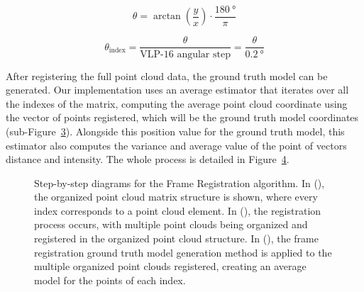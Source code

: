 \begin{equation}
\label{eq:azimuthal-angle}
\theta = \arctan\left(\frac{y}{x}\right) \cdot \frac{\SI{180}{\degree}}{\pi}
\end{equation}

\begin{equation}
\label{eq:azimuthal-angle-index}
\theta_{\text{index}} = \frac{\theta}{\text{VLP-16 angular step}} = \frac{\theta}{\SI{0.2}{\degree}} 
\end{equation}


After registering the full point cloud data, the ground truth model can be generated. Our implementation uses an average estimator that iterates over all the indexes of the matrix, computing the average point cloud coordinate using the vector of points registered, which will be the ground truth model coordinates (sub-Figure~\ref{fig:organized-point-cloud-3}). Alongside this position value for the ground truth model, this estimator also computes the variance and average value of the point of vectors distance and intensity. The whole process is detailed in Figure~\ref{fig:organized-point-cloud}.


\begin{figure}[!ht]
\centering
\begin{subfigure}[c]{0.30\textwidth}
	\def\svgwidth{\columnwidth}
	\graphicspath{{img/lidar-interference/organized-point-cloud/}}
	
	\caption{}
	\label{fig:organized-point-cloud-1}
\end{subfigure}
\quad
\begin{subfigure}[c]{0.30\textwidth}
	\def\svgwidth{\columnwidth}
	\graphicspath{{img/lidar-interference/organized-point-cloud/}}
	
	\caption{}
	\label{fig:organized-point-cloud-2}
\end{subfigure}
\quad
\begin{subfigure}[c]{0.30\textwidth}
	\def\svgwidth{\columnwidth}
	\graphicspath{{img/lidar-interference/organized-point-cloud/}}
	
	\caption{}
	\label{fig:organized-point-cloud-3}
\end{subfigure}

\caption[Step-by-step diagrams for the Frame Registration algorithm.]{Step-by-step diagrams for the Frame Registration algorithm. In (), the organized point cloud matrix structure is shown, where every index corresponds to a point cloud element. In (), the registration process occurs, with multiple point clouds being organized and registered in the organized point cloud structure. In (), the frame registration ground truth model generation method is applied to the multiple organized point clouds registered, creating an average model for the points of each index.}
\label{fig:organized-point-cloud}
\end{figure}


